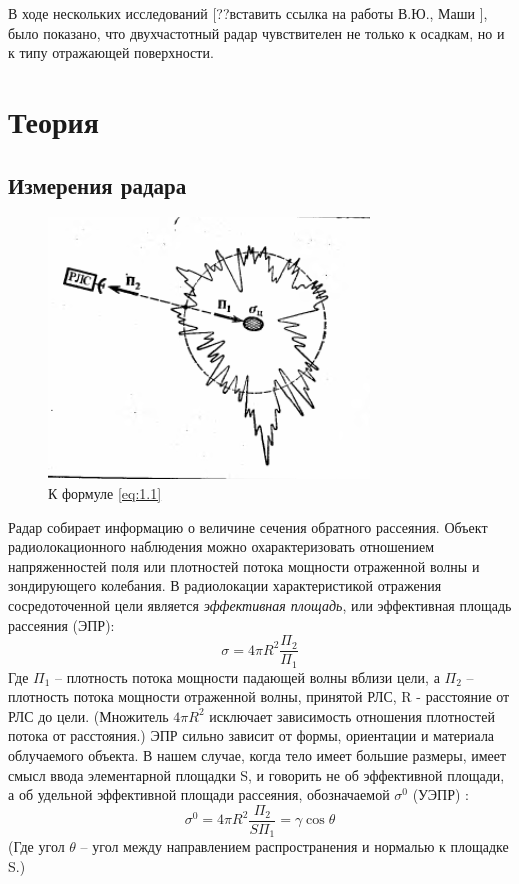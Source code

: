 В ходе нескольких исследований [??вставить ссылка на работы В.Ю., Маши ], было показано, что двухчастотный радар
чувствителен не только к осадкам, но и к типу отражающей поверхности.


\section{Теория}

\subsection{Измерения радара}
\begin{figure}[h!]
  \centering
  \includegraphics[width = .6\linewidth]{img/sigma0melnik.png}
  \caption{К формуле \eqref{eq:1.1}}
  \label{fig:1}
\end{figure}
Радар собирает информацию о величине сечения обратного рассеяния. 
Объект радиолокационного наблюдения можно охарактеризовать отношением напряженностей поля или плотностей потока мощности
отраженной волны и зондирующего колебания. В радиолокации характеристикой отражения сосредоточенной цели
является \textit{эффективная площадь}, или эффективная площадь рассеяния (ЭПР)\cite{meln}:
\begin{equation}
  \sigma = 4 \pi R^2 \frac{\Pi_2}{\Pi_1}
  \label{eq:1}
\end{equation}
Где $\Pi_1$ – плотность потока мощности падающей волны вблизи цели, а $\Pi_2$ – плотность потока мощности отраженной
волны, принятой РЛС, R - расстояние от РЛС до цели. (Множитель $4 \pi R^2$  исключает зависимость отношения плотностей потока от
расстояния.) ЭПР сильно зависит от формы, ориентации и материала облучаемого объекта. В нашем случае, когда тело имеет
большие размеры, имеет смысл ввода элементарной площадки S, и говорить не об эффективной площади, а об удельной
эффективной площади рассеяния, обозначаемой $\sigma^0$ (УЭПР) :
\begin{equation}
  \sigma^0 = 4 \pi R^2 \frac{\Pi_2}{S\Pi_1} = \gamma \cos \theta
  \label{eq:2}
\end{equation}
(Где угол $\theta$ – угол между направлением распространения и нормалью к площадке S.)

